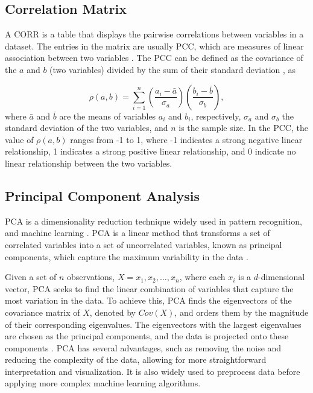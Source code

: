 \subsection{Correlation Matrix}
A \ac{CORR} is a table that displays the pairwise correlations between variables in a dataset. The entries in the matrix are usually \ac{PCC}, which are measures of linear association between two variables \cite{benesty2009Pearson, kuhn2013Applied}. The \ac{PCC} can be defined as the covariance of the $a$ and $b$ (two variables) divided by the sum of their standard deviation \cite{pawan2023Electroencephalogram}, as

\begin{equation}
    \rho(a,b) = \displaystyle \sum^n_{i=1} \left(\frac{a_i-\bar{a}}{\sigma_a}\right) \left(\frac{b_i-\bar{b}}{\sigma_b}\right),
\end{equation}
where $\bar{a}$ and $\bar{b}$ are the means of variables $a_i$ and $b_i$, respectively, $\sigma_a$ and $\sigma_b$ the standard deviation of the two variables, and $n$ is the sample size. In the \ac{PCC}, the value of $\rho(a,b)$ ranges from -1 to 1, where -1 indicates a strong negative linear relationship, 1 indicates a strong positive linear relationship, and 0 indicate no linear relationship between the two variables.

\subsection{Principal Component Analysis}
\ac{PCA} is a dimensionality reduction technique widely used in pattern recognition, and machine learning \cite{wold1987Principal}. \ac{PCA} is a linear method that transforms a set of correlated variables into a set of uncorrelated variables, known as principal components, which capture the maximum variability in the data \cite{jackson1991User}.

Given a set of $n$ observations, $X={x_1,x_2, \dots, x_n}$, where each $x_i$ is a $d$-dimensional vector, \ac{PCA} seeks to find the linear combination of variables that capture the most variation in the data. To achieve this, \ac{PCA} finds the eigenvectors of the covariance matrix of $X$, denoted by $Cov(X)$, and orders them by the magnitude of their corresponding eigenvalues. The eigenvectors with the largest eigenvalues are chosen as the principal components, and the data is projected onto these components \cite{wold1987Principal}. \ac{PCA} has several advantages, such as removing the noise and reducing the complexity of the data, allowing for more straightforward interpretation and visualization. It is also widely used to preprocess data before applying more complex machine learning algorithms.

